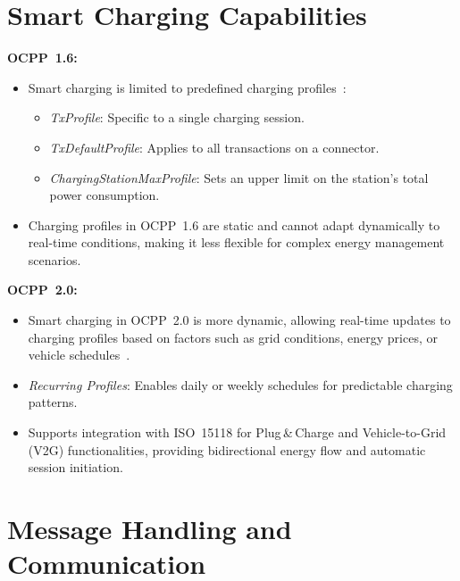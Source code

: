 \documentclass[12pt,a4paper]{report}
\begin{document}
\section{Smart Charging Capabilities}

\textbf{OCPP~1.6:}
\begin{itemize}
  \item Smart charging is limited to predefined charging profiles~\autocite{ocpp16_ed2}:
        \begin{itemize}
          \item \textit{TxProfile}: Specific to a single charging session.
          \item \textit{TxDefaultProfile}: Applies to all transactions on a connector.
          \item \textit{ChargingStationMaxProfile}: Sets an upper limit on the station's total
                power consumption.
        \end{itemize}
  \item Charging profiles in OCPP~1.6 are static and cannot adapt dynamically to real-time
        conditions, making it less flexible for complex energy management scenarios.
\end{itemize}
\noindent
\textbf{OCPP~2.0:}
\begin{itemize}
  \item Smart charging in OCPP~2.0 is more dynamic, allowing real-time updates to charging
        profiles based on factors such as grid conditions, energy prices, or vehicle
        schedules~\autocite{ocpp201}.
  \item \textit{Recurring Profiles}: Enables daily or weekly schedules for predictable charging
        patterns.
  \item Supports integration with ISO~15118 for Plug\,\&\,Charge and Vehicle-to-Grid (V2G)
        functionalities, providing bidirectional energy flow and automatic session initiation.
\end{itemize}

\section{Message Handling and Communication}
\end{document}
